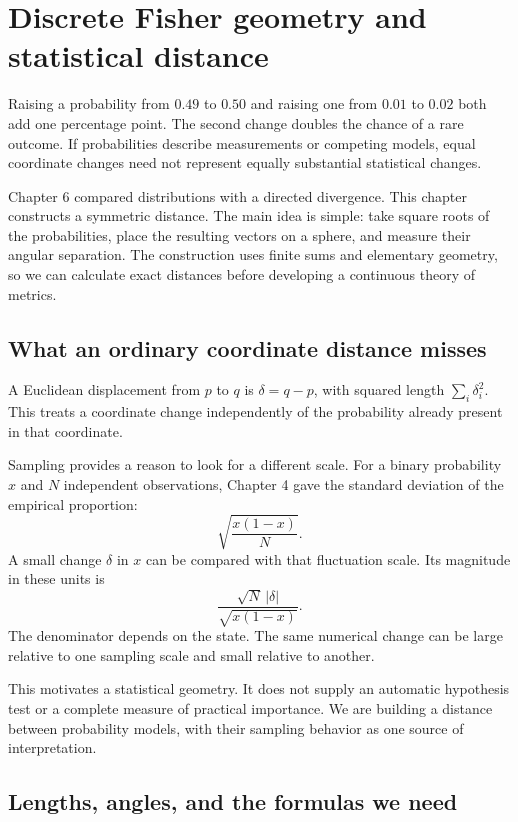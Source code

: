 \documentclass[11pt,oneside,openany]{book}
\theoremstyle{definition}
\theoremstyle{remark}
\numberwithin{equation}{chapter}
\begin{document}
\FloatBarrier

\chapter{Discrete Fisher geometry and statistical distance}
Raising a probability from \(0.49\) to \(0.50\) and raising one from \(0.01\) to \(0.02\) both add one percentage point. The second change doubles the chance of a rare outcome. If probabilities describe measurements or competing models, equal coordinate changes need not represent equally substantial statistical changes.

Chapter 6 compared distributions with a directed divergence. This chapter constructs a symmetric distance. The main idea is simple: take square roots of the probabilities, place the resulting vectors on a sphere, and measure their angular separation. The construction uses finite sums and elementary geometry, so we can calculate exact distances before developing a continuous theory of metrics.

\section{What an ordinary coordinate distance misses}\label{ch07-what-an-ordinary-coordinate-distance-misses}

A Euclidean displacement from \(p\) to \(q\) is \(\delta=q-p\), with squared length \(\sum_i\delta_i^2\). This treats a coordinate change independently of the probability already present in that coordinate.

Sampling provides a reason to look for a different scale. For a binary probability \(x\) and \(N\) independent observations, Chapter 4 gave the standard deviation of the empirical proportion: \[\sqrt{\frac{x(1-x)}N}.\] A small change \(\delta\) in \(x\) can be compared with that fluctuation scale. Its magnitude in these units is \[\frac{\sqrt N\,|\delta|}{\sqrt{x(1-x)}}.\] The denominator depends on the state. The same numerical change can be large relative to one sampling scale and small relative to another.

This motivates a statistical geometry. It does not supply an automatic hypothesis test or a complete measure of practical importance. We are building a distance between probability models, with their sampling behavior as one source of interpretation.

\section{Lengths, angles, and the formulas we need}\label{ch07-lengths-angles-and-the-formulas-we-need}
\end{document}
